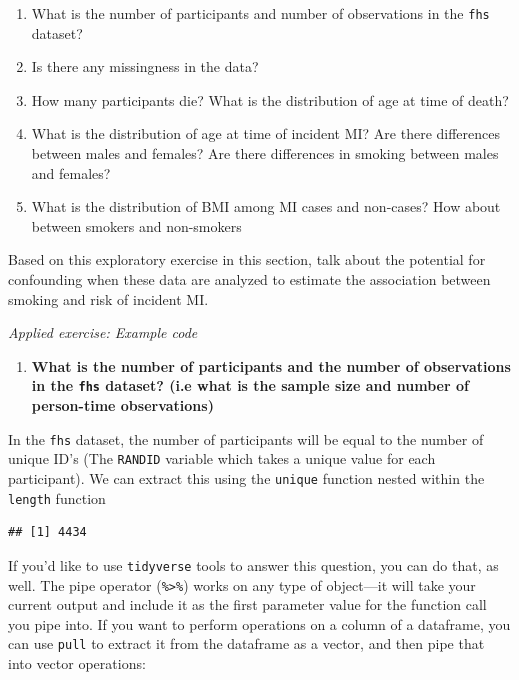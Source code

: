 \documentclass[
]{book}
\newenvironment{Shaded}{\begin{snugshade}}{\end{snugshade}}
\newcommand{\FunctionTok}[1]{\textcolor[rgb]{0.00,0.00,0.00}{#1}}
\newcommand{\NormalTok}[1]{#1}
\newcommand{\SpecialCharTok}[1]{\textcolor[rgb]{0.00,0.00,0.00}{#1}}
\providecommand{\tightlist}{%
  \setlength{\itemsep}{0pt}\setlength{\parskip}{0pt}}
\begin{document}
\begin{enumerate}
\def\labelenumi{\arabic{enumi}.}
\tightlist
\item
  What is the number of participants and number of observations in the \texttt{fhs} dataset?
\item
  Is there any missingness in the data?
\item
  How many participants die? What is the distribution of age at time of death?
\item
  What is the distribution of age at time of incident MI? Are there differences between males and females? Are there differences in smoking between males and females?
\item
  What is the distribution of BMI among MI cases and non-cases? How about between smokers and non-smokers
\end{enumerate}

Based on this exploratory exercise in this section, talk about the potential
for confounding when these data are analyzed to estimate the association between
smoking and risk of incident MI.

\emph{Applied exercise: Example code}

\begin{enumerate}
\def\labelenumi{\arabic{enumi}.}
\tightlist
\item
  \textbf{What is the number of participants and the number of observations in the \texttt{fhs} dataset? (i.e what is the sample size and number of person-time observations)}
\end{enumerate}

In the \texttt{fhs} dataset, the number of participants will be equal to the number of unique ID's (The \texttt{RANDID} variable which takes a unique value for each participant). We can extract this using the \texttt{unique} function nested within the \texttt{length} function

\begin{Shaded}
\end{Shaded}

\begin{verbatim}
## [1] 4434
\end{verbatim}

If you'd like to use \texttt{tidyverse} tools to answer this question, you can do
that, as well. The pipe operator (\texttt{\%\textgreater{}\%}) works on any type of object---it will
take your current output and include it as the first parameter value for the
function call you pipe into. If you want to perform operations on a column of
a dataframe, you can use \texttt{pull} to extract it from the dataframe as a vector, and
then pipe that into vector operations:
\end{document}

